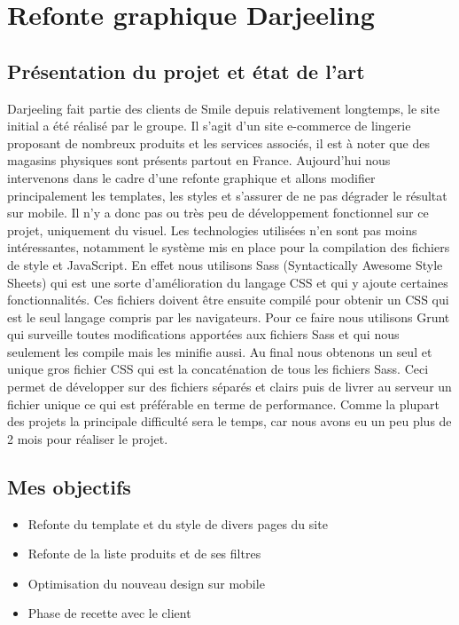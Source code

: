 \documentclass[a4paper,11pt,twoside]{report}
\begin{document}
    \newpage
    
  \section{Refonte graphique Darjeeling}
    \subsection*{Présentation du projet et état de l'art}
    Darjeeling fait partie des clients de Smile depuis relativement longtemps, le site initial a été réalisé par le groupe. Il s'agit d'un site e-commerce de lingerie proposant de nombreux produits et les services associés, il est à noter que des magasins physiques sont présents partout en France. Aujourd'hui nous intervenons dans le cadre d'une refonte graphique et allons modifier principalement les templates, les styles et s'assurer de ne pas dégrader le résultat sur mobile. Il n'y a donc pas ou très peu de développement fonctionnel sur ce projet, uniquement du visuel. Les technologies utilisées n'en sont pas moins intéressantes, notamment le système mis en place pour la compilation des fichiers de style et JavaScript. En effet nous utilisons Sass (Syntactically Awesome Style Sheets) qui est une sorte d'amélioration du langage CSS et qui y ajoute certaines fonctionnalités. Ces fichiers doivent être ensuite compilé pour obtenir un CSS qui est le seul langage compris par les navigateurs. Pour ce faire nous utilisons Grunt qui surveille toutes modifications apportées aux fichiers Sass et qui nous seulement les compile mais les minifie aussi. Au final nous obtenons un seul et unique gros fichier CSS qui est la concaténation de tous les fichiers Sass. Ceci permet de développer sur des fichiers séparés et clairs puis de livrer au serveur un fichier unique ce qui est préférable en terme de performance. Comme la plupart des projets la principale difficulté sera le temps, car nous avons eu un peu plus de 2 mois pour réaliser le projet.
    \subsection*{Mes objectifs}
      \begin{itemize}

	\item Refonte du template et du style de divers pages du site
	\item Refonte de la liste produits et de ses filtres
	\item Optimisation du nouveau design sur mobile
	\item Phase de recette avec le client

      \end{itemize}
\end{document}
